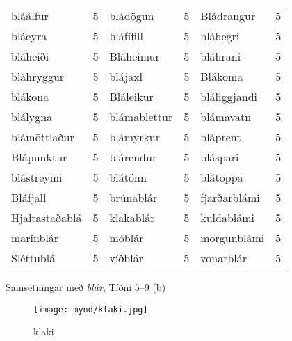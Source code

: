 \documentclass[../samsetningasafn.tex]{subfiles}
\begin{document}
\begin{wordlist}[H]
\begin{tcolorbox}

	\setlength{\extrarowheight}{3pt}
	\begin{tabular}{BlBlBl}		
		bláálfur		& 5		& 
		bládögun	& 5		& 	
		Bládrangur	& 5		\\ 	
		bláeyra		& 5		& 		
		bláfífill		& 5		& 		
		bláhegri		& 5		\\ 	
		bláheiði		& 5		& 		
		Bláheimur	& 5		& 	
		bláhrani		& 5		\\ 	
		bláhryggur	& 5		& 	
		blájaxl		& 5		& 		
		Blákoma		& 5		\\ 	
		blákona		& 5		& 	
		Bláleikur		& 5		& 		
		bláliggjandi	& 5		\\ 		
		blálygna		& 5		& 	
		blámablettur	& 5		& 		
		blámavatn	& 5		\\ 			
		blámöttlaður	& 5		& 		
		blámyrkur	& 5		& 		
		bláprent		& 5		\\ 		
		Blápunktur	& 5		& 	
		blárendur	& 5		& 	
		bláspari		& 5		\\ 		
		blástreymi	& 5		& 	
		blátónn		& 5		& 	
		blátoppa	& 5		\\ 		
		Bláfjall		& 5		& 		
		brúnablár	& 5		& 	
		fjarðarblámi	& 5		\\ 	
		Hjaltastaðablá & 5	& 	
		klakablár	& 	5	& 	
		kuldablámi	& 	5	\\ 	
		marínblár	& 	5	& 	
		móblár		& 	5	& 		
		morgunblámi	& 5	\\ 	
		Sléttublá	&	5	& 		
		víðblár		&	5	& 		
		vonarblár	&	5			
	\end{tabular}

\end{tcolorbox}
	\caption{Samsetningar með \textit{blár}, Tíðni 5--9 (b)}
	\label{listi:blatt.5b}
\end{wordlist}

\begin{figure}[H]
\begin{tcolorbox}
\centering
	\texttt{[image: mynd/klaki.jpg]}
\end{tcolorbox}
	\caption{klaki}
	\label{mynd:klaki}
\end{figure}
	
\end{document}
